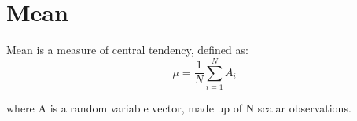 \section{Mean}

Mean is a measure of central tendency, defined as:
\begin{equation}
\mu=\frac{1}{N}\sum_{i=1}^NA_i\label{mean}
\end{equation}

where A is a random variable vector, made up of N scalar observations.